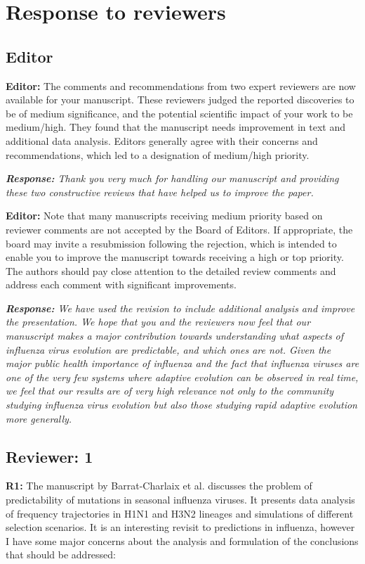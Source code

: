 \documentclass[aps,rmp,onecolumn]{revtex4-1}
\newcommand{\refa}[1]{\textbf{R1:} #1\vskip 5mm}
\newcommand{\editor}[1]{\textbf{Editor:} #1\vskip 5mm}
\newcommand{\response}[1]{{\it {\color{response}\textbf{Response:} #1}}\vskip 5mm}
\begin{document}
\section*{Response to reviewers}

\subsection*{Editor}


\editor{The comments and recommendations from two expert reviewers are now available for your manuscript. These reviewers judged the reported discoveries to be of medium significance, and the potential scientific impact of your work to be medium/high. They found that the manuscript needs improvement in text and additional data analysis. Editors generally agree with their concerns and recommendations, which led to a designation of medium/high priority. }

\response{
Thank you very much for handling our manuscript and providing these two constructive reviews that have helped us to improve the paper.
}


\editor{Note that many manuscripts receiving medium priority based on reviewer comments are not accepted by the Board of Editors. If appropriate, the board may invite a resubmission following the rejection, which is intended to enable you to improve the manuscript towards receiving a high or top priority. The authors should pay close attention to the detailed review comments and address each comment with significant improvements.}

\response{We have used the revision to include additional analysis and improve the presentation. We hope that you and the reviewers now feel that our manuscript makes a major contribution towards understanding what aspects of influenza virus evolution are predictable, and which ones are not. Given the major public health importance of influenza and the fact that influenza viruses are one of the very few systems where adaptive evolution can be observed in real time, we feel that our results are of very high relevance not only to the community studying influenza virus evolution but also those studying rapid adaptive evolution more generally.
}


\subsection*{Reviewer: 1}

\refa{The manuscript by Barrat-Charlaix et al. discusses the problem of
predictability of mutations in seasonal influenza viruses. It presents
data analysis of frequency trajectories in H1N1 and H3N2 lineages and
simulations of different selection scenarios.
It is an interesting revisit to predictions in influenza, however I
have some major concerns about the analysis and formulation of the
conclusions that should be addressed:}
\end{document}
